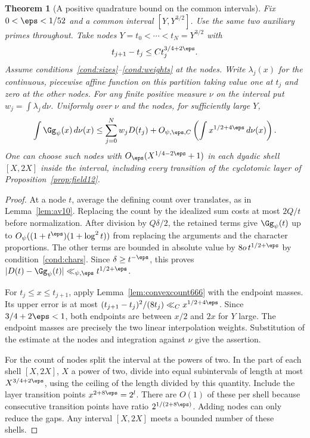 \documentclass[a4paper,11pt]{article}
\newtheorem{theorem}[proposition]{Theorem}
\theoremstyle{definition}
\theoremstyle{remark}
\numberwithin{equation}{section}
\begin{document}
\begin{theorem}[A positive quadrature bound on the common intervals]
\leavevmode\label{thm:nodecount666}
Fix \(0<\eps<1/52\) and a common interval \([Y,Y^{3/2}]\).
Use the same two auxiliary primes throughout. Take nodes
\(Y=t_0<\cdots<t_N=Y^{3/2}\) with
\[
 t_{j+1}-t_j\le C t_j^{3/4+2\eps}.
\]
Assume conditions~\ref{cond:sizes}--\ref{cond:weights} at the
nodes. Write \(\lambda_j(x)\) for the continuous, piecewise affine
function on this partition taking value one at \(t_j\) and zero
at the other nodes. For any finite positive measure \(\nu\) on the
interval put \(w_j=\int\lambda_j\,d\nu\). Uniformly over \(\nu\)
and the nodes, for sufficiently large \(Y\),
\[
  \int\Gg_\psi(x)\,d\nu(x)
   \le \sum_{j=0}^N w_jD(t_j)
          +O_{\psi,\eps,C}\left(\int x^{1/2+4\eps}\,d\nu(x)\right).
\]
One can choose such nodes with \(O_{\eps}(X^{1/4-2\eps}+1)\)
in each dyadic shell \([X,2X]\) inside the interval, including
every transition of the cyclotomic layer of
Proposition~\ref{prop:field12}.
\end{theorem}
\begin{proof}
At a node \(t\), average the defining count over translates,
as in Lemma~\ref{lem:av10}. Replacing the count by the idealized
sum costs at most \(2Q/t\) before normalization. After division
by \(Q\delta/2\), the retained terms give \(\Gg_\psi(t)\) up to
\(O_\psi((1+t^\eps)(1+\log^2 t))\) from replacing the arguments
and the character proportions. The other terms are bounded in
absolute value by \(8o\,t^{1/2+\eps}\) by
condition~\ref{cond:chars}. Since \(\delta\ge t^{-\eps}\), this
proves \(|D(t)-\Gg_\psi(t)|\ll_{\psi,\eps}t^{1/2+\eps}\).

For \(t_j\le x\le t_{j+1}\), apply Lemma~\ref{lem:convexcount666}
with the endpoint masses. Its upper error is at most
\((t_{j+1}-t_j)^2/(8t_j)\ll_C x^{1/2+4\eps}\).
Since \(3/4+2\eps<1\), both endpoints are between \(x/2\)
and \(2x\) for \(Y\) large. The endpoint masses are precisely the
two linear interpolation weights. Substitution of the estimate
at the nodes and integration against \(\nu\) give the assertion.

For the count of nodes split the interval at the powers of two.
In the part of each shell \([X,2X]\), \(X\) a power of two,
divide into equal subintervals of length at most
\(X^{3/4+2\eps}\), using the ceiling of the length divided by
this quantity. Include the layer transition points
\(x^{2+8\eps}=2^l\). There are \(O(1)\) of these per shell because
consecutive transition points have ratio \(2^{1/(2+8\eps)}\).
Adding nodes can only reduce the gaps. Any interval \([X,2X]\)
meets a bounded number of these shells.
\end{proof}
\end{document}
